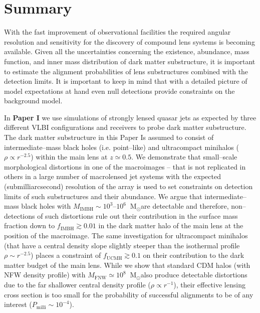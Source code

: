\documentclass[a4wide,12pt]{book}
\newcommand{\msun }{$\mathrm{M}_{\odot}$}
\begin{document}
{\chapter{Summary}
With the fast improvement of observational facilities the required angular resolution and sensitivity for the discovery of compound lens systems is becoming available. Given all the uncertainties concerning the existence, abundance, mass function, and inner mass distribution of dark matter substructure, it is important to estimate the alignment probabilities of lens substructures combined with the detection limits. It is important to keep in mind that with a detailed picture of model expectations at hand even null detections provide constraints on the background model.

In {\bf Paper I} we use simulations of strongly lensed quasar jets as expected by three different VLBI configurations and receivers to probe dark matter substructure. The dark matter substructure in this Paper Is assumed to consist of intermediate--mass black holes (i.e. point--like) and ultracompact minihalos ($\rho \propto r^{-2.5}$) within the main lens at $z \simeq 0.5$. We demonstrate that small--scale morphological distortions in one of the macroimages -- that is not replicated in others in a large number of macrolensed jet systems with the expected (submilliarcsecond) resolution of the array is used to set constraints on detection limits of such substructures and their abundance. We argue that intermediate--mass black holes with $M_\mathrm{IMBH} \sim 10^3$--$10^6\ $ \msun  are detectable and therefore, non--detections of such distortions rule out their contribution in the surface mass fraction down to $f_\mathrm{IMBH}\gtrsim 0.01$ in the dark matter halo of the main lens at the position of the macroimage. The same investigation for ultracompact minihalos (that have a central density slope slightly steeper than the isothermal profile $\rho\sim r^{-2.5}$) places a constraint of $f_\mathrm{UCMH}\gtrsim 0.1$ on their contribution to the dark matter budget of the main lens. While we show that standard CDM halos (with NFW density profile) with $M_\mathrm{FNW} \simeq 10^8\ $ \msun  also produce detectable distortions due to the far shallower central density profile ($\rho \propto r^{-1}$), their effective lensing cross section is too small for the probability of successful alignments to be of any interest ($P_\mathrm{milli}\sim 10^{-4}$).

}
\end{document}
